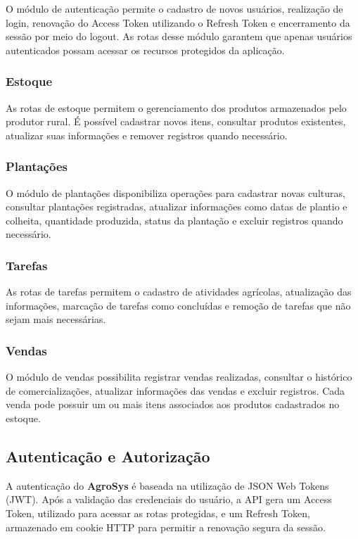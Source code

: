 \documentclass[12pt]{article}
\begin{document}
O módulo de autenticação permite o cadastro de novos usuários, realização de login, renovação do Access Token utilizando o Refresh Token e encerramento da sessão por meio do logout. As rotas desse módulo garantem que apenas usuários autenticados possam acessar os recursos protegidos da aplicação.

\subsubsection{Estoque}

As rotas de estoque permitem o gerenciamento dos produtos armazenados pelo produtor rural. É possível cadastrar novos itens, consultar produtos existentes, atualizar suas informações e remover registros quando necessário.

\subsubsection{Plantações}

O módulo de plantações disponibiliza operações para cadastrar novas culturas, consultar plantações registradas, atualizar informações como datas de plantio e colheita, quantidade produzida, status da plantação e excluir registros quando necessário.

\subsubsection{Tarefas}

As rotas de tarefas permitem o cadastro de atividades agrícolas, atualização das informações, marcação de tarefas como concluídas e remoção de tarefas que não sejam mais necessárias.

\subsubsection{Vendas}

O módulo de vendas possibilita registrar vendas realizadas, consultar o histórico de comercializações, atualizar informações das vendas e excluir registros. Cada venda pode possuir um ou mais itens associados aos produtos cadastrados no estoque.

\subsection{Autenticação e Autorização}

A autenticação do \textbf{AgroSys} é baseada na utilização de JSON Web Tokens (JWT). Após a validação das credenciais do usuário, a API gera um Access Token, utilizado para acessar as rotas protegidas, e um Refresh Token, armazenado em cookie HTTP para permitir a renovação segura da sessão.
\end{document}
